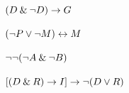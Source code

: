 \begin{earg}

\item	$(D \mathbin{\&} {\neg} D) \rightarrow G $




\item	$({\neg} P \vee {\neg} M) \leftrightarrow M $




\item	${\neg} {\neg} ({\neg} A \mathbin{\&} {\neg} B)  $




\item 	$[(D \mathbin{\&} R) \rightarrow I] \rightarrow {\neg}(D \vee R) $


\end{earg}
